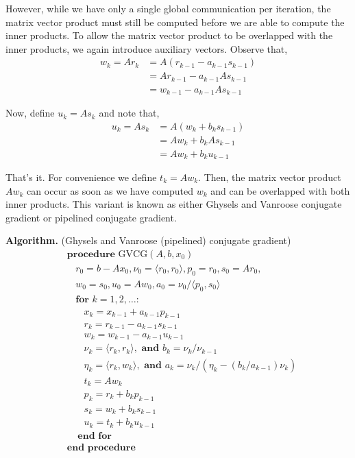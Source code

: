 \documentclass[10pt]{article}
\begin{document}
However, while we have only a single global communication per iteration, the matrix vector product must still be computed before we are able to compute the inner products.
To allow the matrix vector product to be overlapped with the inner products, we again introduce auxiliary vectors.
Observe that,
\begin{align*}
w_k = Ar_k &= A(r_{k-1} - a_{k-1}s_{k-1}) 
\\&= A r_{k-1} - a_{k-1} As_{k-1}
\\&= w_{k-1} - a_{k-1} As_{k-1}
\end{align*}

Now, define \(u_{k} = As_{k}\) and note that,
\begin{align*}
u_{k} = As_k &= A(w_k + b_k s_{k-1}) 
\\&= Aw_k + b_k As_{k-1} 
\\&= Aw_k + b_k u_{k-1}
\end{align*}

That's it. For convenience we define \(t_k = Aw_k\).
Then, the matrix vector product \(Aw_k\) can occur as soon as we have computed \(w_k\) and can be overlapped with both inner products.
This variant is known as either Ghysels and Vanroose conjugate gradient or pipelined conjugate gradient.

\textbf{Algorithm.} (Ghysels and Vanroose (pipelined) conjugate gradient)
\begin{align*}
&\textbf{procedure}\text{ GVCG}( A,b,x_0 ) 
\\[-.4em]&~~~~r_0 = b-Ax_0, \nu_0 = \langle r_0,r_0 \rangle, p_0 = r_0, s_0 = Ar_0, 
\\[-.4em]&~~~~w_0 = s_0, u_0 = Aw_0, a_0 = \nu_0 / \langle p_0,s_0 \rangle
\\[-.4em]&~~~~\textbf{for } k=1,2,\ldots \textbf{:} 
\\[-.4em]&~~~~~~~~x_k = x_{k-1} + a_{k-1} p_{k-1} 
\\[-.4em]&~~~~~~~~r_k = r_{k-1} - a_{k-1} s_{k-1} 
\\[-.4em]&~~~~~~~~w_k = w_{k-1} - a_{k-1} u_{k-1}
\\[-.4em]&~~~~~~~~\nu_k = \langle r_k,r_k\rangle, \textbf{ and } b_k = \nu_k/\nu_{k-1}
\\[-.4em]&~~~~~~~~\eta_{k} = \langle r_k,w_k \rangle, \textbf{ and } a_k = \nu_k / (\eta_k - (b_k/a_{k-1})\nu_k)
\\[-.4em]&~~~~~~~~t_k = Aw_k
\\[-.4em]&~~~~~~~~p_k = r_k + b_k p_{k-1}
\\[-.4em]&~~~~~~~~s_k = w_k + b_k s_{k-1}
\\[-.4em]&~~~~~~~~u_k = t_k + b_k u_{k-1}
\\[-.4em]&~~~~~\textbf{end for}
\\[-.4em]&\textbf{end procedure}
\end{align*}
\end{document}
